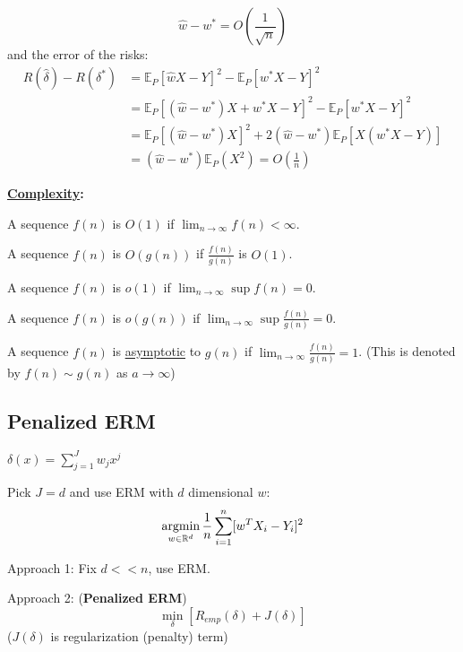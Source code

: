 \documentclass[11pt]{elegantbook}
\newcommand{\argmin}{\operatornamewithlimits{argmin}}
\begin{document}
$$\hat{w}-w^*=O(\frac{1}{\sqrt{n}})$$
and the error of the risks:
\begin{equation}
    \begin{aligned}
        R(\hat{\delta})-R(\delta^*)&=\mathbb{E}_P[\hat{w}X-Y]^2-\mathbb{E}_P[w^*X-Y]^2\\
        &=\mathbb{E}_P[(\hat{w}-w^*)X+w^*X-Y]^2-\mathbb{E}_P[w^*X-Y]^2\\
        &=\mathbb{E}_P[(\hat{w}-w^*)X]^2+2(\hat{w}-w^*)\mathbb{E}_P[X(w^*X-Y)]\\
        &=(\hat{w}-w^*)\mathbb{E}_P(X^2)=O\left(\frac{1}{n}\right)
    \end{aligned}
    \nonumber
\end{equation}

\textbf{\underline{Complexity}:}
\begin{definition}
    A sequence $f(n)$ is $O(1)$ if $\lim_{n \rightarrow \infty}f(n)<\infty$.
\end{definition}

\begin{definition}
    A sequence $f(n)$ is $O(g(n))$ if $\frac{f(n)}{g(n)}$ is $O(1)$.
\end{definition}

\begin{definition}
    A sequence $f(n)$ is $o(1)$ if $\lim_{n \rightarrow \infty}\sup f(n)=0$.
\end{definition}

\begin{definition}
    A sequence $f(n)$ is $o(g(n))$ if $\lim_{n \rightarrow \infty}\sup \frac{f(n)}{g(n)}=0$.
\end{definition}

\begin{definition}
    A sequence $f(n)$ is \underline{asymptotic} to $g(n)$ if $\lim_{n \rightarrow \infty} \frac{f(n)}{g(n)}=1$. (This is denoted by $f(n)\sim g(n)$ as $a \rightarrow \infty$)
\end{definition}

\subsection{Penalized ERM}
$\delta(x)=\sum_{j=1}^Jw_jx^j$

Pick $J=d$ and use ERM with $d$ dimensional $w$: $$\argmin_{w\in \mathbb{R}^d} \frac{1}{n}\sum_{i=1}^n[w^TX_i-Y_i]^2$$

Approach 1: Fix $d<<n$, use ERM.

Approach 2: (\textbf{Penalized ERM}) $$\min_\delta [R_{emp}(\delta)+J(\delta)]$$ ($J(\delta)$ is regularization (penalty) term)
\end{document}
